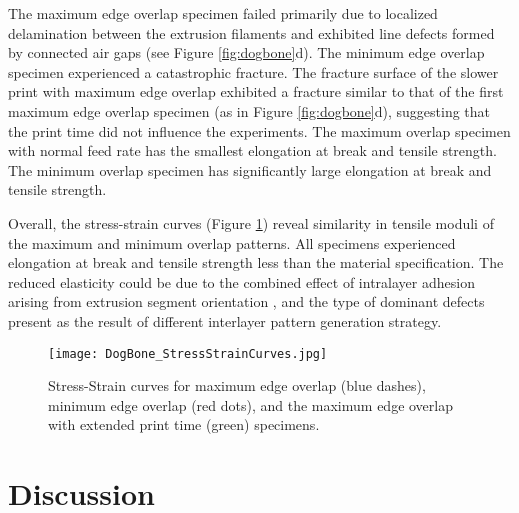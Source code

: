 The maximum edge overlap specimen failed  primarily due to localized delamination between the extrusion filaments \cite{DoJu2019} and exhibited line defects formed by connected air gaps (see Figure \ref{fig:dogbone}d).
The minimum edge overlap specimen experienced a catastrophic fracture.
The fracture surface of the slower print with maximum edge overlap exhibited a  fracture similar to that of the first maximum edge overlap specimen (as in Figure \ref{fig:dogbone}d), suggesting that the print time did not influence the experiments.
The maximum overlap specimen with normal feed rate has the smallest elongation at break and tensile strength.
The minimum overlap specimen has significantly large elongation at break and tensile strength.

Overall, the stress-strain curves (Figure \ref{fig:dogboneStrStrCrvs}) reveal similarity in tensile moduli of the maximum and minimum overlap patterns. All
specimens experienced elongation at break and tensile strength less than the material specification.
The reduced elasticity could be due to the combined effect of intralayer adhesion arising from extrusion segment orientation \cite{ToRo2016}, and the type of dominant defects \cite{FaMoKa2019}  present as the result of different interlayer pattern generation strategy.
\begin{figure}[ht!]
  \centering
  \texttt{[image: DogBone\_StressStrainCurves.jpg]}
  \caption{\label{fig:dogboneStrStrCrvs}
    Stress-Strain curves for maximum edge overlap (blue dashes), minimum edge overlap (red dots), and the maximum edge overlap with extended print time (green) specimens.
  }
\end{figure}


\section{Discussion}

